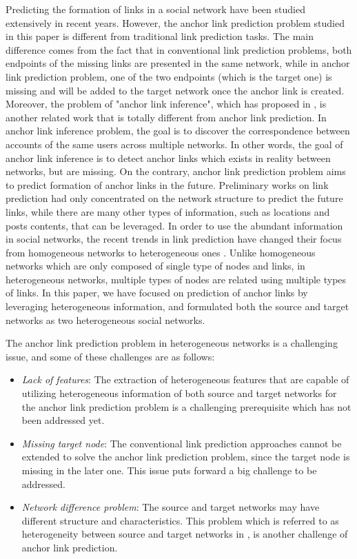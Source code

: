 \documentclass[conference]{IEEEtran}
\begin{document}
Predicting the formation of links in a social network have been studied extensively in recent years. However, the anchor link prediction problem studied in this paper is different from traditional link prediction tasks. The main difference comes from the fact that in conventional link prediction problems, both endpoints of the missing links are presented in the same network, while in anchor link prediction problem, one of the two endpoints (which is the target one) is missing and will be added to the target network once the anchor link is created. Moreover, the problem of "anchor link inference", which has proposed in \cite{kong2013}, is another related work that is totally different from anchor link prediction. In anchor link inference problem, the goal is to discover the correspondence between accounts of the same users across multiple networks. In other words, the goal of anchor link inference is to detect anchor links which exists in reality between networks, but are missing. On the contrary, anchor link prediction problem aims to predict formation of anchor links in the future.
Preliminary works on link prediction had only concentrated on the network structure to predict the future links, while there are many other types of information, such as locations and posts contents, that can be leveraged. In order to use the abundant information in social networks, the recent trends in link prediction have changed their focus from homogeneous networks to heterogeneous ones \cite{davis2011, sun2011co, yang2012link}. Unlike homogeneous networks which are only composed of single type of nodes and links, in heterogeneous networks, multiple types of nodes are related using multiple types of links. In this paper, we have focused on prediction of anchor links by leveraging heterogeneous information, and formulated both the source and target networks as two heterogeneous social networks.

The anchor link prediction problem in heterogeneous networks is a challenging issue, and some of these challenges are as follows:

\begin{itemize}
\item \textit{Lack of features}:
The extraction of heterogeneous features that are capable of utilizing heterogeneous information of both source and target networks for the anchor link prediction problem is a challenging prerequisite which has not been addressed yet.

\item \textit{Missing target node}:
The conventional link prediction approaches cannot be extended to solve the anchor link prediction problem, since the target node is missing in the later one. This issue puts forward a big challenge to be addressed.

\item \textit{Network difference problem}:
The source and target networks may have different structure and characteristics. This problem which is referred to as heterogeneity between source and target networks in \cite{wu2014learning}, is another challenge of anchor link prediction.
\end{itemize}
\end{document}

